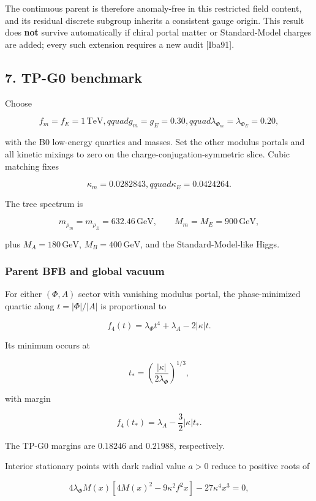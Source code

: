 \documentclass[
]{article}
\begin{document}
The continuous parent is therefore anomaly-free in this restricted field
content, and its residual discrete subgroup inherits a consistent gauge
origin. This result does \textbf{not} survive automatically if chiral
portal matter or Standard-Model charges are added; every such extension
requires a new audit {[}Iba91{]}.

\hypertarget{tp-g0-benchmark}{%
\subsection{7. TP-G0 benchmark}\label{tp-g0-benchmark}}

Choose

\[
f_m=f_E=1\,\mathrm{TeV},qquad
g_m=g_E=0.30,qquad
\lambda_{\Phi_m}=\lambda_{\Phi_E}=0.20,
\]

with the B0 low-energy quartics and masses. Set the other modulus
portals and all kinetic mixings to zero on the
charge-conjugation-symmetric slice. Cubic matching fixes

\[
\kappa_m=0.0282843,qquad
\kappa_E=0.0424264.
\]

The tree spectrum is

\[
m_{\rho_m}=m_{\rho_E}=632.46\,\mathrm{GeV},
\qquad
M_m=M_E=900\,\mathrm{GeV},
\]

plus \(M_A=180\,\mathrm{GeV}\), \(M_B=400\,\mathrm{GeV}\), and the
Standard-Model-like Higgs.

\hypertarget{parent-bfb-and-global-vacuum}{%
\subsubsection{Parent BFB and global
vacuum}\label{parent-bfb-and-global-vacuum}}

For either \((\Phi,A)\) sector with vanishing modulus portal, the
phase-minimized quartic along \(t=|\Phi|/|A|\) is proportional to

\[
f_4(t)=\lambda_\Phi t^4+\lambda_A-2|\kappa|t.
\]

Its minimum occurs at

\[
t_*=\left(\frac{|\kappa|}{2\lambda_\Phi}\right)^{1/3},
\]

with margin

\[
f_4(t_*)=\lambda_A-\frac32|\kappa|t_*.
\]

The TP-G0 margins are \(0.18246\) and \(0.21988\), respectively.

Interior stationary points with dark radial value \(a>0\) reduce to
positive roots of

\[
4\lambda_\Phi M(x)
\left[4M(x)^2-9\kappa^2f^2x\right]
-27\kappa^4x^3=0,
\]
\end{document}
